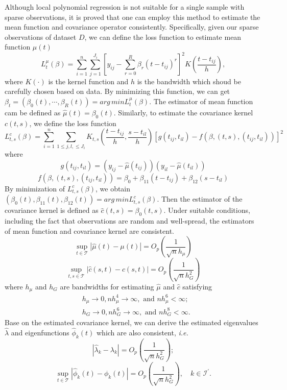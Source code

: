 \documentclass{article}
\begin{document}
Although local polynomial regression is not suitable for a single sample with sparse observations, 
it is proved that one can employ this method to estimate the mean function and covariance operator consistently.
Specifically, given our sparse observations of dataset $D$,
we can define the loss function to estimate mean function $\mu(t)$
$$
L_t^\mu(\beta)=\sum_{i=1}^n\sum_{j=1}^{J_i}\left[y_{ij}-\sum_{r=0}^R \beta_r\left(t-t_{ij}\right)^r\right]^2 K\left(\frac{t-t_{ij}}{h}\right),
$$
where $K(\cdot)$ is the kernel function and $h$ is the bandwidth which shoud be carefully chosen based on data.
By minimizing this function, we can get
$\beta_t=(\beta_0(t), \cdots, \beta_R(t))=arg\,min L_t^\mu(\beta)$. The estimator of mean function cam be defined as $\hat{\mu}(t)=\beta_0(t)$.
Similarly, to estimate the covariance kernel $c(t,s)$, we define the loss function 
$$
L^c_{t,s}(\beta)=\sum_{i=1}^n \sum_{1\leq j, l, \leq J_i} K_{t,s}(\frac{t-t_{ij}}{h}, \frac{s-t_{il}}{h}) \left[ g(t_{ij},t_{il})-f\left(\beta,(t,s),(t_{ij},t_{il})\right) \right]^2
$$
where
$$
g(t_{ij},t_{il})=(y_{ij}-\hat{\mu}(t_{ij}))(y_{il}-\hat{\mu}(t_{il}))
$$
$$
f\left(\beta,(t,s),(t_{ij},t_{il})\right)=\beta_0 + \beta_{11}(t-t_{ij})+\beta_{12}(s-t_{il})
$$
By minimization of $L_{t,s}^c(\beta)$, we obtain $(\beta_0(t),\beta_{11}(t),\beta_{12}(t))=arg\,min L_{t,s}^c(\beta)$. Then the estimator of the covariance kernel is defined as $\hat{c}(t,s)=\beta_0(t,s)$.
Under suitable conditions, including the fact that observations are random and well-spread, the estimators of mean function and covariance kernel are consistent.\cite{yao2005functional} 
$$
\sup _{t \in \mathcal{T}}|\hat{\mu}(t)-\mu(t)|=O_p\left(\frac{1}{\sqrt{n} h_\mu}\right)
$$
$$
\sup _{t, s \in \mathcal{T}}|\hat{c}(s, t)-c(s, t)|=O_p\left(\frac{1}{\sqrt{n} h_G^2}\right)
$$
where $h_\mu$ and $h_G$ are bandwidths for estimating $\hat \mu$ and $\hat c$ satisfying
$$
\begin{aligned}
& h_\mu \rightarrow 0, n h_\mu^4 \rightarrow \infty, \text { and } n h_\mu^6<\infty; \\
& h_G \rightarrow 0, n h_G^6 \rightarrow \infty, \text { and } n h_G^8<\infty.
\end{aligned}
$$
Base on the estimated covariance kernel, we can derive the estimated  eigenvalues $\hat \lambda$ and eigenfunctions $\hat{\phi}_k(t)$ which are also consistent, \textit{i.e.}
$$
\left|\hat{\lambda}_k-\lambda_k\right|=O_p\left(\frac{1}{\sqrt{n} h_G^2}\right);
$$
$$
\sup _{t \in \mathcal{T}}\left|\hat{\phi}_k(t)-\phi_k(t)\right|=O_p\left(\frac{1}{\sqrt{n} h_G^2}\right), \quad k \in \mathcal{I}^{\prime}.
$$
\end{document}
